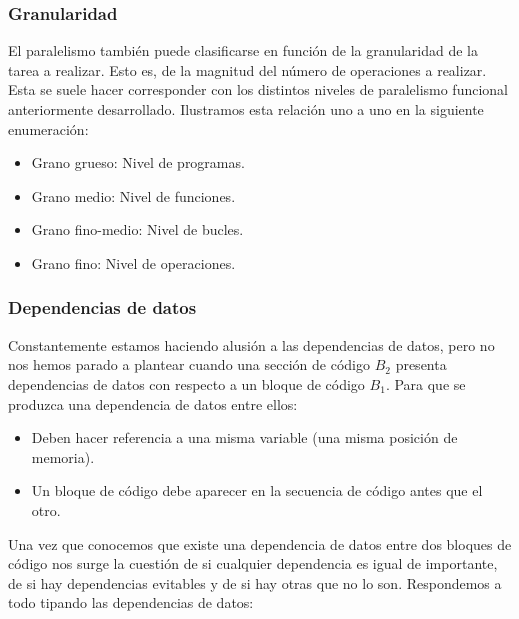 \subsubsection{Granularidad}
El paralelismo también puede clasificarse en función de la granularidad de la tarea a realizar. Esto es, de la magnitud del número de operaciones a realizar. Esta se suele hacer corresponder con los distintos niveles de paralelismo funcional anteriormente desarrollado. Ilustramos esta relación uno a uno en la siguiente enumeración:
\begin{itemize}
    \item Grano grueso: Nivel de programas.
    \item Grano medio: Nivel de funciones.
    \item Grano fino-medio: Nivel de bucles.
    \item Grano fino: Nivel de operaciones.
\end{itemize}

\subsubsection{Dependencias de datos}
Constantemente estamos haciendo alusión a las dependencias de datos, pero no nos hemos parado a plantear cuando una sección de código $B_2$ presenta dependencias de datos con respecto a un bloque de código $B_1$. Para que se produzca una dependencia de datos entre ellos:
\begin{itemize}
    \item Deben hacer referencia a una misma variable (una misma posición de memoria).
    \item Un bloque de código debe aparecer en la secuencia de código antes que el otro.
\end{itemize}

Una vez que conocemos que existe una dependencia de datos entre dos bloques de código nos surge la cuestión de si cualquier dependencia es igual de importante, de si hay dependencias evitables y de si hay otras que no lo son. Respondemos a todo tipando las dependencias de datos:

